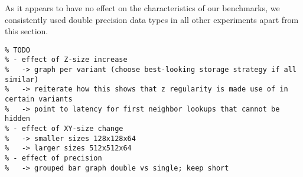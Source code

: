 As it appears to have no effect on the characteristics of our benchmarks, we consistently used double precision data types in all other experiments apart from this section.

\begin{verbatim}
% TODO
% - effect of Z-size increase
%   -> graph per variant (choose best-looking storage strategy if all similar)
%   -> reiterate how this shows that z regularity is made use of in certain variants
%   -> point to latency for first neighbor lookups that cannot be hidden
% - effect of XY-size change
%   -> smaller sizes 128x128x64
%   -> larger sizes 512x512x64
% - effect of precision
%   -> grouped bar graph double vs single; keep short
\end{verbatim}